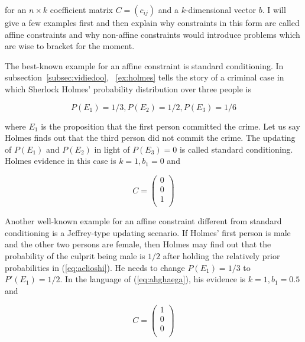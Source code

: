 \documentclass[phd,12pt,oneside]{ubcthesis}
\begin{document}
{\noindent}for an $n\times{}k$ coefficient matrix $C=(c_{ij})$ and a
$k$-dimensional vector $b$. I will give a few examples first and then
explain why constraints in this form are called affine constraints and
why non-affine constraints would introduce problems which are wise to
bracket for the moment.

The best-known example for an affine constraint is standard
conditioning. In subsection~\ref{subsec:vidiedoo},
{\xample}~\ref{ex:holmes} tells the story of a criminal case in which
Sherlock Holmes' probability distribution over three people is

\begin{equation}
  \label{eq:aelioshi}
P(E_{1})=1/3,P(E_{2})=1/2,P(E_{3})=1/6
\end{equation}

{\noindent}where $E_{1}$ is the proposition that the first person
committed the crime. Let us say Holmes finds out that the third person
did not commit the crime. The updating of $P(E_{1})$ and $P(E_{2})$ in
light of $P(E_{3})=0$ is called standard conditioning. Holmes evidence
in this case is $k=1,b_{1}=0$ and

\begin{equation}
  \label{eq:uphaicho}
  C=\left(
  \begin{array}{c}
    0 \\
    0 \\
    1 \\
  \end{array}\right)
\end{equation}

Another well-known example for an affine constraint different from
standard conditioning is a Jeffrey-type updating scenario. If Holmes'
first person is male and the other two persons are female, then Holmes
may find out that the probability of the culprit being male is $1/2$
after holding the relatively prior probabilities in
(\ref{eq:aelioshi}). He needs to change $P(E_{1})=1/3$ to
$P'(E_{1})=1/2$. In the language of (\ref{eq:ahghaega}), his evidence
is $k=1,b_{1}=0.5$ and

\begin{equation}
  \label{eq:eifohgee}
  C=\left(
  \begin{array}{c}
    1 \\
    0 \\
    0 \\
  \end{array}\right)
\end{equation}
\end{document}
